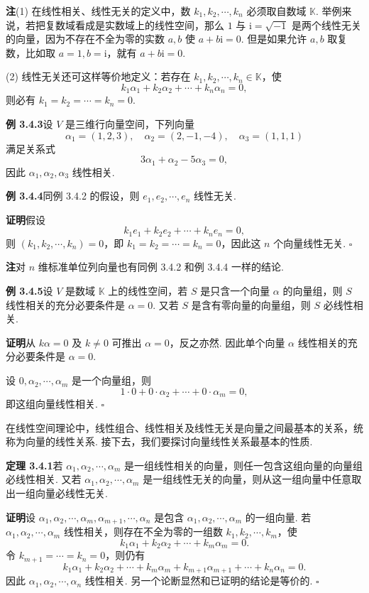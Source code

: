 \documentclass[UTF8, 12pt, fontset=fandol, oneside]{ctexart}
\begin{document}
\noindent\textbf{注}\quad (1) 在线性相关、线性无关的定义中，数 $k_1,k_2,\cdots,k_n$ 必须取自数域 $\mathbb{K}$. 举例来说，若把复数域看成是实数域上的线性空间，那么 $1$ 与 $\mathrm{i}=\sqrt{-1}$ 是两个线性无关的向量，因为不存在不全为零的实数 $a,b$ 使 $a+b\mathrm{i}=0$. 但是如果允许 $a,b$ 取复数，比如取 $a=1,b=\mathrm{i}$，就有 $a+b\mathrm{i}=0$.

(2) 线性无关还可这样等价地定义：若存在 $k_1,k_2,\cdots,k_n\in\mathbb{K}$，使
\[
k_1\alpha_1+k_2\alpha_2+\cdots+k_n\alpha_n=0,
\]
则必有 $k_1=k_2=\cdots=k_n=0$.

\noindent\textbf{例 3.4.3}\quad 设 $V$ 是三维行向量空间，下列向量
\[
\alpha_1=(1,2,3),\quad \alpha_2=(2,-1,-4),\quad \alpha_3=(1,1,1)
\]
满足关系式
\[
3\alpha_1+\alpha_2-5\alpha_3=0,
\]
因此 $\alpha_1,\alpha_2,\alpha_3$ 线性相关.

\noindent\textbf{例 3.4.4}\quad 同例 3.4.2 的假设，则 $e_1,e_2,\cdots,e_n$ 线性无关.

\noindent\textbf{证明}\quad 假设
\[
k_1e_1+k_2e_2+\cdots+k_ne_n=0,
\]
则 $(k_1,k_2,\cdots,k_n)=0$，即 $k_1=k_2=\cdots=k_n=0$，因此这 $n$ 个向量线性无关. $\square$

\noindent\textbf{注}\quad 对 $n$ 维标准单位列向量也有同例 3.4.2 和例 3.4.4 一样的结论.

\noindent\textbf{例 3.4.5}\quad 设 $V$ 是数域 $\mathbb{K}$ 上的线性空间，若 $S$ 是只含一个向量 $\alpha$ 的向量组，则 $S$ 线性相关的充分必要条件是 $\alpha=0$. 又若 $S$ 是含有零向量的向量组，则 $S$ 必线性相关.

\noindent\textbf{证明}\quad 从 $k\alpha=0$ 及 $k\neq 0$ 可推出 $\alpha=0$，反之亦然. 因此单个向量 $\alpha$ 线性相关的充分必要条件是 $\alpha=0$.

设 $0,\alpha_2,\cdots,\alpha_m$ 是一个向量组，则
\[
1\cdot 0+0\cdot\alpha_2+\cdots+0\cdot\alpha_m=0,
\]
即这组向量线性相关. $\square$

在线性空间理论中，线性组合、线性相关及线性无关是向量之间最基本的关系，统称为向量的线性关系. 接下去，我们要探讨向量线性关系最基本的性质.

\noindent\textbf{定理 3.4.1}\quad 若 $\alpha_1,\alpha_2,\cdots,\alpha_m$ 是一组线性相关的向量，则任一包含这组向量的向量组必线性相关. 又若 $\alpha_1,\alpha_2,\cdots,\alpha_m$ 是一组线性无关的向量，则从这一组向量中任意取出一组向量必线性无关.

\noindent\textbf{证明}\quad 设 $\alpha_1,\alpha_2,\cdots,\alpha_m,\alpha_{m+1},\cdots,\alpha_n$ 是包含 $\alpha_1,\alpha_2,\cdots,\alpha_m$ 的一组向量. 若 $\alpha_1,\alpha_2,\cdots,\alpha_m$ 线性相关，则存在不全为零的一组数 $k_1,k_2,\cdots,k_m$，使
\[
k_1\alpha_1+k_2\alpha_2+\cdots+k_m\alpha_m=0.
\]
令 $k_{m+1}=\cdots=k_n=0$，则仍有
\[
k_1\alpha_1+k_2\alpha_2+\cdots+k_m\alpha_m+k_{m+1}\alpha_{m+1}+\cdots+k_n\alpha_n=0.
\]
因此 $\alpha_1,\alpha_2,\cdots,\alpha_n$ 线性相关. 另一个论断显然和已证明的结论是等价的. $\square$
\end{document}
